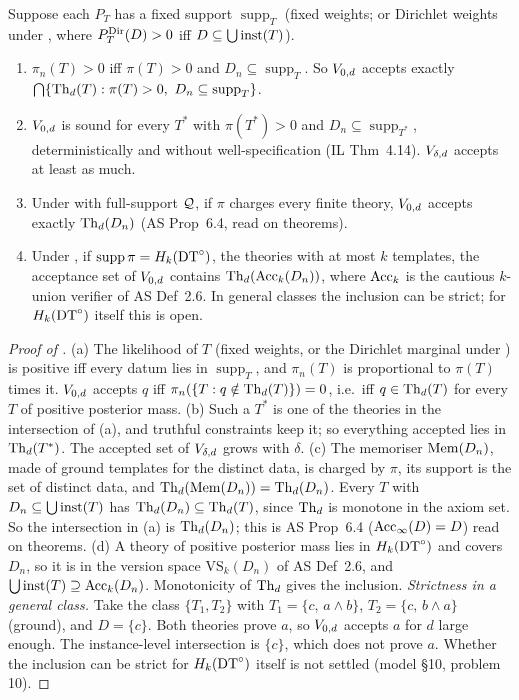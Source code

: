 \begin{proposition}\label{prop:sound:cautious}
Suppose each $P_T$ has a fixed support $\operatorname{supp}_T$ (fixed weights; or Dirichlet weights under \Lzero, where $P^{\mathrm{Dir}}_{T}(D)>0$ iff $D\subseteq\bigcup\mathrm{inst}(T)$).
\begin{enumerate}[label=(\alph*)]
\item $\pi_n(T)>0$ iff $\pi(T)>0$ and $D_n\subseteq\operatorname{supp}_T$. So $V_{0,d}$ accepts exactly $\bigcap\{\Th_d(T):\pi(T)>0,\ D_n\subseteq\operatorname{supp}_T\}$.
\item $V_{0,d}$ is sound for every $T^*$ with $\pi(T^*)>0$ and $D_n\subseteq\operatorname{supp}_{T^*}$, deterministically and without well-specification (IL Thm~4.14). $V_{\delta,d}$ accepts at least as much.
\item Under \Lzero{} with full-support $\mathcal{Q}$, if $\pi$ charges every finite theory, $V_{0,d}$ accepts exactly $\mathrm{Th}_d(D_n)$ (AS Prop~6.4, read on theorems).
\item Under \Lzero, if $\operatorname{supp}\pi=H_{k}(\mathrm{DT}^{\circ})$, the theories with at most $k$ templates, the acceptance set of $V_{0,d}$ contains $\mathrm{Th}_d(\mathrm{Acc}_k(D_n))$, where $\mathrm{Acc}_k$ is the cautious $k$-union verifier of AS Def~2.6. In general classes the inclusion can be strict; for $H_{k}(\mathrm{DT}^{\circ})$ itself this is open.
\end{enumerate}
\end{proposition}

\begin{proof}[Proof of ]
(a) The likelihood of $T$ (fixed weights, or the Dirichlet marginal under \Lzero) is positive iff every datum lies in $\operatorname{supp}_T$, and $\pi_n(T)$ is proportional to $\pi(T)$ times it. $V_{0,d}$ accepts $q$ iff $\pi_n(\{T:q\notin\mathrm{Th}_d(T)\})=0$, i.e.\ iff $q\in\mathrm{Th}_d(T)$ for every $T$ of positive posterior mass.
(b) Such a $T^*$ is one of the theories in the intersection of (a), and truthful constraints keep it; so everything accepted lies in $\mathrm{Th}_d(T^*)$. The accepted set of $V_{\delta,d}$ grows with $\delta$.
(c) The memoriser $\mathrm{Mem}(D_n)$, made of ground templates for the distinct data, is charged by $\pi$, its support is the set of distinct data, and $\mathrm{Th}_d(\mathrm{Mem}(D_n))=\mathrm{Th}_d(D_n)$. Every $T$ with $D_n\subseteq\bigcup\mathrm{inst}(T)$ has $\mathrm{Th}_d(D_n)\subseteq\mathrm{Th}_d(T)$, since $\mathrm{Th}_d$ is monotone in the axiom set. So the intersection in (a) is $\mathrm{Th}_d(D_n)$; this is AS Prop~6.4 ($\mathrm{Acc}_\infty(D)=D$) read on theorems.
(d) A theory of positive posterior mass lies in $H_{k}(\mathrm{DT}^{\circ})$ and covers $D_n$, so it is in the version space $\mathrm{VS}_k(D_n)$ of AS Def~2.6, and $\bigcup\mathrm{inst}(T)\supseteq\mathrm{Acc}_k(D_n)$. Monotonicity of $\mathrm{Th}_d$ gives the inclusion.
\emph{Strictness in a general class.} Take the class $\{T_1,T_2\}$ with $T_1=\{c,\,a\wedge b\}$, $T_2=\{c,\,b\wedge a\}$ (ground), and $D=\{c\}$. Both theories prove $a$, so $V_{0,d}$ accepts $a$ for $d$ large enough. The instance-level intersection is $\{c\}$, which does not prove $a$. Whether the inclusion can be strict for $H_{k}(\mathrm{DT}^{\circ})$ itself is not settled (model \S10, problem 10).
\end{proof}

